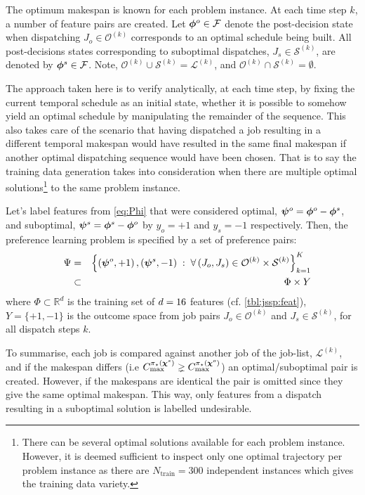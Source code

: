 \documentclass[twocolumn]{svjour3}
\begin{document}
The optimum makespan is known for each problem instance. At each time step $k$, 
a number of feature pairs are created. 
Let $\bm{\phi}^{o}\in\mathcal{F}$ denote the post-decision state when dispatching 
$J_o\in\mathcal{O}^{(k)}$ corresponds to an optimal schedule being built. 
All post-decisions states corresponding to suboptimal dispatches, 
$J_s\in\mathcal{S}^{(k)}$, are denoted by $\bm{\phi}^{s}\in\mathcal{F}$.
Note, \mbox{$\mathcal{O}^{(k)}\cup\mathcal{S}^{(k)}=\mathcal{L}^{(k)}$}, and 
\mbox{$\mathcal{O}^{(k)}\cap\mathcal{S}^{(k)}=\emptyset$}.

The approach taken here is to verify analytically, at each time step, by fixing 
the current temporal schedule as an initial state, whether it is possible to 
somehow yield an optimal schedule by manipulating the remainder of the 
sequence. This also takes care of the scenario that having dispatched a job 
resulting in a different temporal makespan would have resulted in the same 
final makespan if another optimal dispatching sequence would have been chosen. 
That is to say the training data generation takes into consideration when there 
are multiple optimal solutions\footnote{
There can be several optimal solutions available for each problem instance. 
However, it is deemed sufficient to inspect only one optimal trajectory per 
problem instance as there are $N_{\text{train}}=300$ independent instances 
which gives the training data variety.} 
to the same problem instance. 

Let's label features from \cref{eq:Phi} that were considered optimal, 
\mbox{$\bm \psi^{o}=\bm{\phi}^{o}-\bm{\phi}^{s}$}, and suboptimal, 
\mbox{$\bm \psi^{s}=\bm{\phi}^{s}-\bm{\phi}^{o}$} by $y_o=+1$ and $y_s=-1$ respectively. 
Then, the preference learning problem is specified by a set of preference pairs:
\begin{eqnarray}
\quad \Psi &=& 
\left\{\left(\bm \psi^o,+1\right),\left(\bm \psi^s,-1\right)
\;:\;
\forall \left(J_o,J_s\right) \in \mathcal{O}^{(k)} \times 
\mathcal{S}^{(k)}\right\}_{k=1}^{K} \nonumber
\\ &\subset& \Phi\times Y \label{eq:prefset}
\end{eqnarray}
where $\Phi\subset \mathbb{R}^d$ is the training set of $d=16$ 
features (cf. \cref{tbl:jssp:feat}), $Y=\{+1,-1\}$ is the outcome space from 
job pairs $J_o\in\mathcal{O}^{(k)}$ and $J_s\in\mathcal{S}^{(k)}$, for all 
dispatch steps $k$.

To summarise, each job is compared against another job of the job-list, 
$\mathcal{L}^{(k)}$, and if the makespan differs (i.e 
$C_{\max}^{\pi_\star(\bm \chi^s)} \gneq C_{\max}^{\pi_\star(\bm \chi^o)}$) an 
optimal/suboptimal pair is created. 
However, if the makespans are identical the pair is omitted since they give the 
same optimal makespan. 
This way, only features from a dispatch resulting in a suboptimal solution is 
labelled undesirable.
\end{document}
